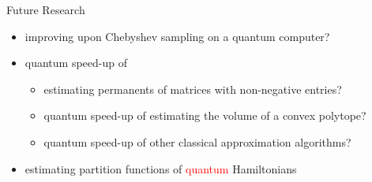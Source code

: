 \documentclass[slideColor]{prosper}
\renewcommand{\>}{\rangle}
\newcommand{\<}{\langle}
\begin{document}
\begin{slide}{Future Research}

\begin{itemize}
\item improving upon Chebyshev sampling on a quantum computer?

\item quantum speed-up of 

\medskip
\begin{itemize}
\item estimating permanents of matrices with non-negative entries?

\medskip
\item quantum speed-up of estimating the volume of a convex polytope?

\medskip 
\item quantum speed-up of other classical approximation algorithms?
\end{itemize}

\medskip
\item estimating partition functions of \textcolor{red}{quantum} Hamiltonians
\end{itemize}

\end{slide}

\end{document}
